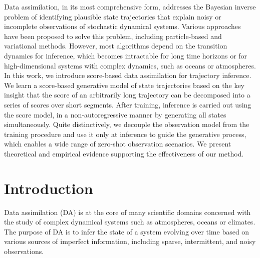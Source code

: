 Data assimilation, in its most comprehensive form, addresses the Bayesian inverse problem of identifying plausible state trajectories that explain noisy or incomplete observations of stochastic dynamical systems. Various approaches have been proposed to solve this problem, including particle-based and variational methods. However, most algorithms depend on the transition dynamics for inference, which becomes intractable for long time horizons or for high-dimensional systems with complex dynamics, such as oceans or atmospheres. In this work, we introduce score-based data assimilation for trajectory inference. We learn a score-based generative model of state trajectories based on the key insight that the score of an arbitrarily long trajectory can be decomposed into a series of scores over short segments. After training, inference is carried out using the score model, in a non-autoregressive manner by generating all states simultaneously. Quite distinctively, we decouple the observation model from the training procedure and use it only at inference to guide the generative process, which enables a wide range of zero-shot observation scenarios. We present theoretical and empirical evidence supporting the effectiveness of our method.

\section{Introduction}

Data assimilation (DA) \cite{lorenc1986analysis, ledimet1986variational, evensen1994sequential, hamill2006ensemblebased,tremolet2006accounting, tremolet2007modelerror, fisher2011weakconstraint, carrassi2018data, ecmwf2020ifs} is at the core of many scientific domains concerned with the study of complex dynamical systems such as atmospheres, oceans or climates. The purpose of DA is to infer the state of a system evolving over time based on various sources of imperfect information, including sparse, intermittent, and noisy observations.

